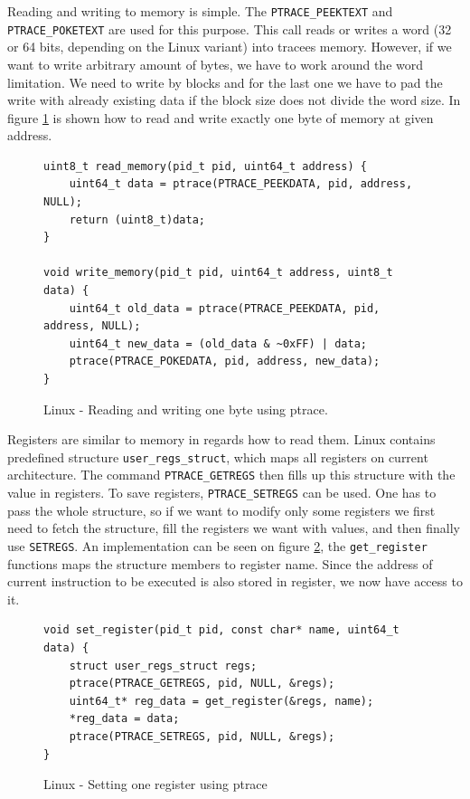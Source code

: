 Reading and writing to memory is simple. The \texttt{PTRACE\_PEEKTEXT} and
\texttt{PTRACE\_POKETEXT} are used for this purpose. This call reads or writes
a word (32 or 64 bits, depending on the Linux variant) into tracees memory.
However, if we want to write arbitrary amount of bytes, we have to work around
the word limitation. We need to write by blocks and for the last one we have to
pad the write with already existing data if the block size does not divide the
word size. In figure \ref{fig:write-read} is shown how to read and write
exactly one byte of memory at given address.

\begin{figure}\label{fig:write-read}
    \begin{verbatim}
uint8_t read_memory(pid_t pid, uint64_t address) {
    uint64_t data = ptrace(PTRACE_PEEKDATA, pid, address, NULL);
    return (uint8_t)data;
}

void write_memory(pid_t pid, uint64_t address, uint8_t data) {
    uint64_t old_data = ptrace(PTRACE_PEEKDATA, pid, address, NULL);
    uint64_t new_data = (old_data & ~0xFF) | data;
    ptrace(PTRACE_POKEDATA, pid, address, new_data);
}
    \end{verbatim}
    \caption{Linux - Reading and writing one byte using ptrace.}
\end{figure}

Registers are similar to memory in regards how to read them. Linux contains
predefined structure \texttt{user\_regs\_struct}, which maps all registers on
current architecture. The command \texttt{PTRACE\_GETREGS} then fills up this
structure with the value in registers. To save registers,
\texttt{PTRACE\_SETREGS} can be used. One has to pass the whole structure, so
if we want to modify only some registers we first need to fetch the structure,
fill the registers we want with values, and then finally use \texttt{SETREGS}.
An implementation can be seen on figure \ref{fig:set-register}, the
\texttt{get\_register} functions maps the structure members to register name.
Since the address of current instruction to be executed is also stored in
register, we now have access to it.

\begin{figure}\label{fig:set-register}
    \begin{verbatim}
void set_register(pid_t pid, const char* name, uint64_t data) {
    struct user_regs_struct regs;
    ptrace(PTRACE_GETREGS, pid, NULL, &regs);
    uint64_t* reg_data = get_register(&regs, name);
    *reg_data = data;
    ptrace(PTRACE_SETREGS, pid, NULL, &regs);
}
    \end{verbatim}
    \caption{Linux - Setting one register using ptrace}
\end{figure}


